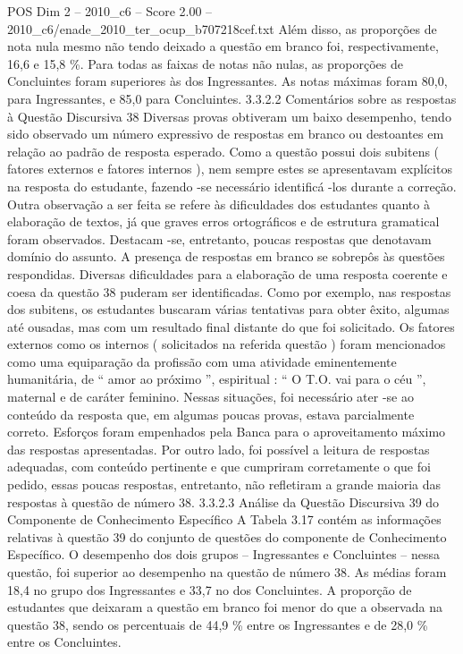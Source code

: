 \begin{textsample}{POS Dim 2 – 2010\_c6 – Score 2.00 – 2010\_c6/enade\_2010\_ter\_ocup\_b707218cef.txt}
Além disso, as proporções de nota nula mesmo não tendo deixado a questão em branco foi, respectivamente, 16,6 e 15,8 \%.
Para todas as faixas de notas não nulas, as proporções de Concluintes foram superiores às dos Ingressantes.
As notas máximas foram 80,0, para Ingressantes, e 85,0 para Concluintes. 3.3.2.2 Comentários sobre as respostas à Questão Discursiva 38 Diversas provas obtiveram um baixo desempenho, tendo sido observado um número expressivo de respostas em branco ou destoantes em relação ao padrão de resposta esperado.
Como a questão possui dois subitens ( fatores externos e fatores internos ), nem sempre estes se apresentavam explícitos na resposta do estudante, fazendo -se necessário identificá -los durante a correção.
Outra observação a ser feita se refere às dificuldades dos estudantes quanto à elaboração de textos, já que graves erros ortográficos e de estrutura gramatical foram observados.
Destacam -se, entretanto, poucas respostas que denotavam domínio do assunto.
A presença de respostas em branco se sobrepôs às questões respondidas.
Diversas dificuldades para a elaboração de uma resposta coerente e coesa da questão 38 puderam ser identificadas.
Como por exemplo, nas respostas dos subitens, os estudantes buscaram várias tentativas para obter êxito, algumas até ousadas, mas com um resultado final distante do que foi solicitado.
Os fatores externos como os internos ( solicitados na referida questão ) foram mencionados como uma equiparação da profissão com uma atividade eminentemente humanitária, de “ amor ao próximo ”, espiritual : “ O T.O. vai para o céu ”, maternal e de caráter feminino.
Nessas situações, foi necessário ater -se ao conteúdo da resposta que, em algumas poucas provas, estava parcialmente correto.
Esforços foram empenhados pela Banca para o aproveitamento máximo das respostas apresentadas.
Por outro lado, foi possível a leitura de respostas adequadas, com conteúdo pertinente e que cumpriram corretamente o que foi pedido, essas poucas respostas, entretanto, não refletiram a grande maioria das respostas à questão de número 38. 3.3.2.3 Análise da Questão Discursiva 39 do Componente de Conhecimento Específico A Tabela 3.17 contém as informações relativas à questão 39 do conjunto de questões do componente de Conhecimento Específico.
O desempenho dos dois grupos – Ingressantes e Concluintes – nessa questão, foi superior ao desempenho na questão de número 38.
As médias foram 18,4 no grupo dos Ingressantes e 33,7 no dos Concluintes.
A proporção de estudantes que deixaram a questão em branco foi menor do que a observada na questão 38, sendo os percentuais de 44,9 \% entre os Ingressantes e de 28,0 \% entre os Concluintes.

\end{textsample}
